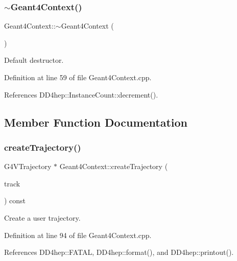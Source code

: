 \subsubsection{\texorpdfstring{$\sim$\+Geant4\+Context()}{~Geant4Context()}}
{\footnotesize\ttfamily Geant4\+Context\+::$\sim$\+Geant4\+Context (\begin{DoxyParamCaption}{ }\end{DoxyParamCaption})\hspace{0.3cm}{\ttfamily [virtual]}}



Default destructor. 



Definition at line 59 of file Geant4\+Context.\+cpp.



References D\+D4hep\+::\+Instance\+Count\+::decrement().



\subsection{Member Function Documentation}
\hypertarget{class_d_d4hep_1_1_simulation_1_1_geant4_context_ac47c311e301ba100e6cdd432e7bd8265}{}\label{class_d_d4hep_1_1_simulation_1_1_geant4_context_ac47c311e301ba100e6cdd432e7bd8265} 
\subsubsection{\texorpdfstring{create\+Trajectory()}{createTrajectory()}}
{\footnotesize\ttfamily G4\+V\+Trajectory $\ast$ Geant4\+Context\+::create\+Trajectory (\begin{DoxyParamCaption}\item[{const G4\+Track $\ast$}]{track }\end{DoxyParamCaption}) const\hspace{0.3cm}{\ttfamily [virtual]}}



Create a user trajectory. 



Definition at line 94 of file Geant4\+Context.\+cpp.



References D\+D4hep\+::\+F\+A\+T\+AL, D\+D4hep\+::format(), and D\+D4hep\+::printout().



